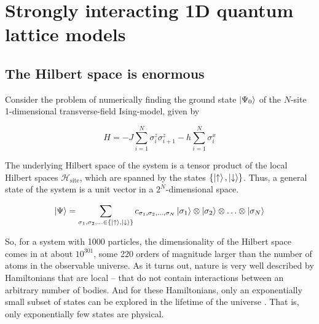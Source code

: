 \section{Strongly interacting 1D quantum lattice models}

\subsection{The Hilbert space is enormous}

Consider the problem of numerically finding the ground state $\ket{\Psi_0}$ of the
$N$-site 1-dimensional transverse-field Ising-model, given by

\begin{equation} 
  H = -J \sum_{i = 1}^{N} \sigma_{i}^{z}\sigma_{i+1}^{z}
  - h \sum_{i=1}^{N} \sigma_{i}^{x}
\end{equation}

The underlying Hilbert space of the system is a tensor product of the
local Hilbert spaces $\mathcal{H}_{\text{site}}$, which are spanned by the
states $\{\ket{\uparrow}, \ket{\downarrow}\}$. Thus, a general state of the system is a unit vector in
a $2^N$-dimensional space.

\begin{equation}
  \ket{\Psi} = \sum_{\sigma_1, \sigma_2, \ldots \in \{\ket{\uparrow}, \ket{\downarrow}\}} c_{\sigma_1, \sigma_2, \ldots, \sigma_N} \ket{\sigma_1} \otimes \ket{\sigma_2} \otimes \ldots \otimes \ket{\sigma_N}
\end{equation}

So, for a system with 1000 particles, the dimensionality of the Hilbert
space comes in at about $10^{301}$, some 220 orders of magnitude larger than
the number of atoms in the observable universe. As it turns out, nature is
very well described by Hamiltonians that are local -- that do not contain
interactions between an arbitrary number of bodies. And for these
Hamiltonians, only an exponentially small subset of states can be explored
in the lifetime of the universe \cite{poulin2011quantum}. That is, only
exponentially few states are physical. 
